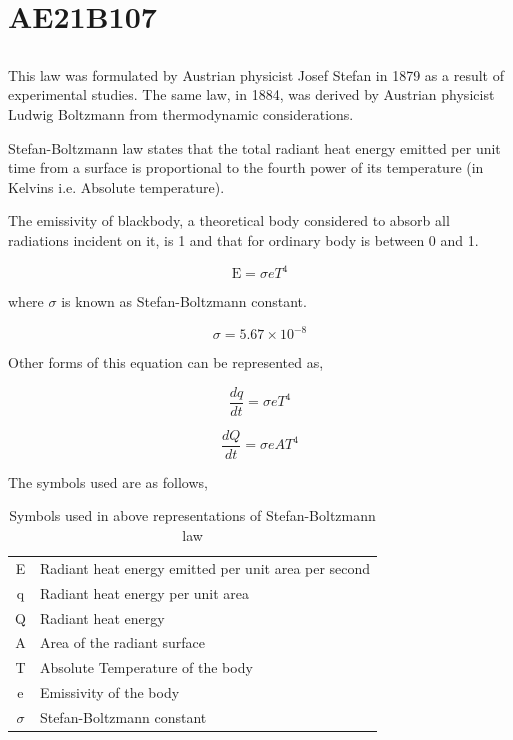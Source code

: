 \section{AE21B107}

\subsection*{}

This law was formulated by Austrian physicist Josef Stefan in 1879 as a result of experimental studies. The same law, in 1884, was derived by Austrian physicist Ludwig Boltzmann from thermodynamic considerations.

Stefan-Boltzmann law states that the total radiant heat energy emitted per unit time from a surface is proportional to the fourth power of its temperature (in Kelvins i.e. Absolute temperature).

The emissivity of blackbody, a theoretical body considered to absorb all radiations incident on it, is 1 and that for ordinary body is between 0 and 1.

\begin{equation}
    \text{E} = {\sigma}{eT^4} 
\end{equation}

where $\sigma$ is known as Stefan-Boltzmann constant.

\begin{equation*}
      {\sigma} = 5.67 \times 10^{-8}
\end{equation*}

Other forms of this equation can be represented as,

\begin{equation}
    \frac{dq}{dt} = {\sigma}{eT^4}
\end{equation}

\begin{equation}
    \frac{dQ}{dt} = {\sigma}{eAT^4}
\end{equation}

The symbols used are as follows,

\begin{table}[h]
    \centering
    \begin{tabular}{|c|l|}
    \hline
    E & Radiant heat energy emitted per unit area per second \\
    q & Radiant heat energy per unit area \\
    Q & Radiant heat energy\\
    A & Area of the radiant surface\\
    T & Absolute Temperature of the body\\
    e & Emissivity of the body\\
    $\sigma$ & Stefan-Boltzmann constant \\
    \hline
    \end{tabular}
    \caption{Symbols used in above representations of Stefan-Boltzmann law}
\end{table}

